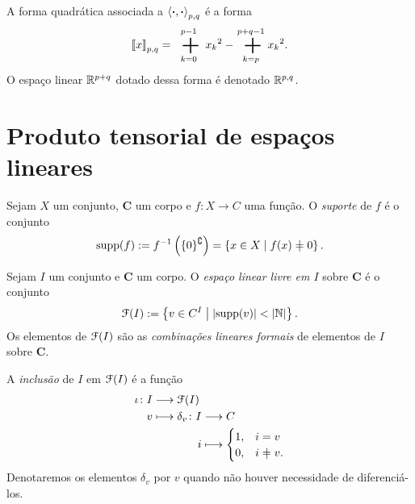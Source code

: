 A forma quadrática associada a $\left\langle{\bm{\cdot}},{\bm{\cdot}}\right\rangle_{p,q}$ é a forma
	\begin{equation*}
	\qua{x}_{p,q} = \sum_{k=0}^{p-1}{x_k}^2 - \sum_{k=p}^{p+q-1}{x_k}^2.
	\end{equation*}
O espaço linear $\mathbb{R}^{p+q}$ dotado dessa forma é denotado $\mathbb{R}^{p,q}$.





\cleardoublepage





\section{Produto tensorial de espaços lineares}

\begin{definition}
Sejam $X$ um conjunto, $\bm C$ um corpo e $f: X \to C$ uma função. O \emph{suporte} de $f$ é o conjunto
	\begin{equation*}
	\supp(f) := f\inv\left(\{0\}^\complement\right) = \set{x \in X}{f(x) \neq 0}.
	\end{equation*}
\end{definition}


\begin{definition} Sejam $I$ um conjunto e $\bm C$ um corpo. O \emph{espaço linear livre em $I$} sobre $\bm C$ é o conjunto 
	\begin{equation*}
	\mathcal{F}(I) := \left\{{v \in C^I}\;\middle\vert\;{\left\lvert{\operatorname{supp}(v)}\right\rvert<\left\lvert{\mathbb{N}}\right\rvert}\right\}.
	\end{equation*}
Os elementos de $\mathcal{F}(I)$ são as \emph{combinações lineares formais} de elementos de $I$ sobre $\bm C$.

A \emph{inclusão} de $I$ em $\mathcal{F}(I)$ é a função
	\begin{align*}
	\func{\iota}{I}{\liv(I)}{v}{
		\begin{aligned}[t]
		\func{\delta_v}{I}{C}{i}{\begin{cases}
							1,& i = v \\
							0,& i \neq v.
						\end{cases}}
		\end{aligned}	
	}
	\end{align*}
Denotaremos os elementos $\delta_v$ por $v$ quando não houver necessidade de diferenciá-los.
\end{definition}

